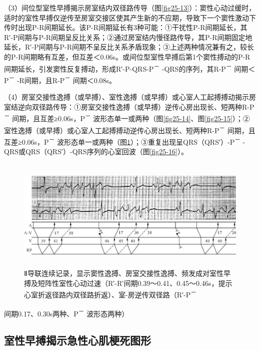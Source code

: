 （3）间位型室性早搏揭示房室结内双径路传导（图\ref{fig25-13}）：窦性心动过缓时，适时的室性早搏仅逆传至房室交接区使其产生新的不应期，导致下一个窦性激动下传时出现P-R间期延长。该P-R间期延长有3种可能：①干扰性P-R间期延长，其R′-P间期与P-R间期呈反比关系；②通过房室结内慢径路传导，其P-R间期固定地延长，R′-P间期与P-R间期不呈反比关系矛盾现象；③上述两种情况兼有之，较长的P-R间期略有互差，但互差＜0.06s。或间位型室性早搏后第1个窦性搏动的P-R间期延长，引发窦性反复搏动，形成R′-P-QRS-P\textsuperscript{－}
-QRS的序列，其R-P\textsuperscript{－} 间期＜P\textsuperscript{－}
-R间期，且R-P\textsuperscript{－} 间期＜0.08s。

（4）房室交接性逸搏（或早搏）、室性逸搏（或早搏）或心室人工起搏搏动揭示房室结逆向双径路传导：①房室交接性逸搏（或早搏）逆传心房出现长、短两种R-P\textsuperscript{－}
间期，且互差≥0.06s，P\textsuperscript{－}
波形态单一或两种（图\ref{fig25-14}、图\ref{fig25-15}）；②室性逸搏（或早搏）或心室人工起搏搏动逆传心房出现长、短两种R-P\textsuperscript{－}
间期，且互差≥0.06s，P\textsuperscript{－}
波形态单一或两种（图\ref{fig36-6}）；③重复出现呈QRS（QRS′）-P\textsuperscript{－}
-QRS或QRS（QRS′）-QRS序列的心室回波（图\ref{fig25-16}）。

\begin{figure}[!htbp]
 \centering
 \includegraphics[width=5.79167in,height=2.13542in]{./images/Image00578.jpg}
 \captionsetup{justification=centering}
 \caption{Ⅱ导联连续记录，显示窦性逸搏、房室交接性逸搏、频发成对室性早搏及短阵性室性心动过速（R′-R′间期0.39～0.41、0.45～0.46s，提示心室折返径路内双径路折返）、室-房逆传双径路（R′-P\textsuperscript{－}}
 \label{fig36-6}
  \end{figure} 
间期0.17、0.30s两种、P\textsuperscript{－} 波形态两种）

\protect\hypertarget{text00043.htmlux5cux23subid469}{}{}

\subsection{室性早搏揭示急性心肌梗死图形}

